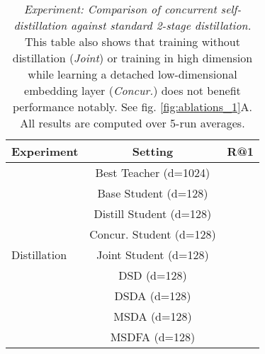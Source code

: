 \documentclass{article} \usepackage{arxiv_style,times}
\begin{document}
 
\begin{table}[h]
 \small
   \centering
    \caption{\textit{Experiment: Comparison of concurrent self-distillation against standard 2-stage distillation.} This table also shows that training without distillation (\textit{Joint}) or training in high dimension while learning a detached low-dimensional embedding layer (\textit{Concur.}) does not benefit performance notably. See fig. \ref{fig:ablations_1}A. All results are computed over 5-run averages.}   
   \begin{tabular}{l||c|c}
     \toprule
     Experiment & Setting & R@1\\
     \midrule
     \multirow{9}{*}{Distillation} & Best Teacher (d=1024) & \\
     & Base Student (d=128) & \\
     & Distill Student (d=128) & \\
     & Concur. Student (d=128) & \\
     & Joint Student (d=128) & \\
     & DSD   (d=128) & \\
     & DSDA  (d=128) & \\
     & MSDA (d=128) & \\
     & MSDFA (d=128) & \\
    \bottomrule
    \end{tabular}
    \label{tab:ablations_6}
 \end{table}
\end{document}
